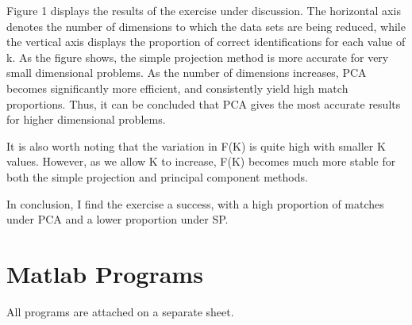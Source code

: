 \documentclass[11pt]{article} %
\begin{document}
Figure  1 displays the results of the exercise under discussion. The horizontal axis denotes the number of dimensions to which the data sets are being reduced, while the vertical axis displays the proportion of correct identifications for each value of k. As the figure shows, the simple projection method is more accurate for very small dimensional problems. As the number of dimensions increases, PCA becomes significantly more efficient, and consistently yield high match proportions. Thus, it can be concluded that PCA gives the most accurate results for higher dimensional problems.

It is also worth noting that the variation in F(K) is quite high with smaller K values. However, as we allow K to increase, F(K) becomes much more stable for both the simple projection and principal component methods.

In conclusion, I find the exercise a success, with a high proportion of matches under PCA and a lower proportion under SP.  

\section{Matlab Programs}

All programs are attached on a separate sheet.
\end{document}
